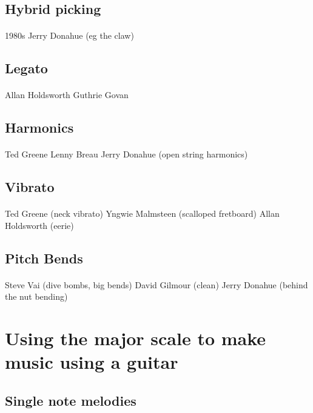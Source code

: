 \documentclass{article}
\begin{document}
\subsection{Hybrid picking}
\paragraph{}
1980s Jerry Donahue (eg the claw)

\subsection{Legato}
\paragraph{}
Allan Holdsworth
Guthrie Govan

\subsection{Harmonics}
\paragraph{}
Ted Greene
Lenny Breau
Jerry Donahue (open string harmonics)

\subsection{Vibrato}
\paragraph{}
Ted Greene (neck vibrato)
Yngwie Malmsteen (scalloped fretboard)
Allan Holdsworth (eerie)

\subsection{Pitch Bends}
\paragraph{}
Steve Vai (dive bombs, big bends)
David Gilmour (clean)
Jerry Donahue (behind the nut bending)


\section{Using the major scale to make music using a guitar}
\subsection{Single note melodies}
\end{document}
